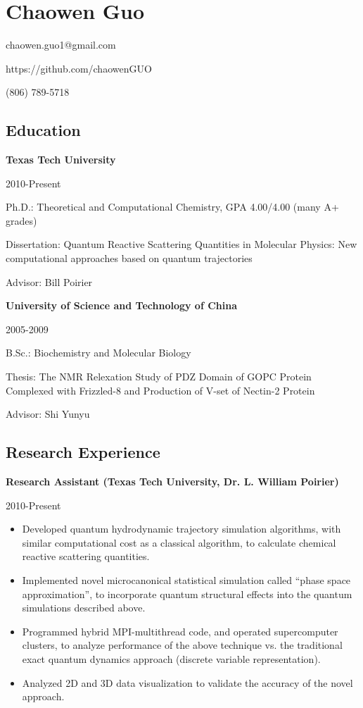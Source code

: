 \documentclass[
]{article}
\author{}
\date{}
\providecommand{\tightlist}{%
  \setlength{\itemsep}{0pt}\setlength{\parskip}{0pt}}
\begin{document}
\hypertarget{chaowen-guo}{%
\section{Chaowen Guo}\label{chaowen-guo}}

chaowen.guo1@gmail.com

https://github.com/chaowenGUO

(806) 789-5718

\hypertarget{education}{%
\subsection{Education}\label{education}}

\textbf{Texas Tech University}

2010-Present

Ph.D.: Theoretical and Computational Chemistry, GPA 4.00/4.00 (many A+
grades)

Dissertation: Quantum Reactive Scattering Quantities in Molecular
Physics: New computational approaches based on quantum trajectories

Advisor: Bill Poirier

\hfill\break

\textbf{University of Science and Technology of China}

2005-2009

B.Sc.: Biochemistry and Molecular Biology

Thesis: The NMR Relexation Study of PDZ Domain of GOPC Protein Complexed
with Frizzled-8 and Production of V-set of Nectin-2 Protein

Advisor: Shi Yunyu

\hypertarget{research-experience}{%
\subsection{Research Experience}\label{research-experience}}

\textbf{Research Assistant (Texas Tech University, Dr. L. William
Poirier)}

2010-Present

\begin{itemize}
\tightlist
\item
  Developed quantum hydrodynamic trajectory simulation algorithms, with
  similar computational cost as a classical algorithm, to calculate
  chemical reactive scattering quantities.
\item
  Implemented novel microcanonical statistical simulation called ``phase
  space approximation'', to incorporate quantum structural effects into
  the quantum simulations described above.
\item
  Programmed hybrid MPI-multithread code, and operated supercomputer
  clusters, to analyze performance of the above technique vs. the
  traditional exact quantum dynamics approach (discrete variable
  representation).
\item
  Analyzed 2D and 3D data visualization to validate the accuracy of the
  novel approach.
\end{itemize}
\end{document}
